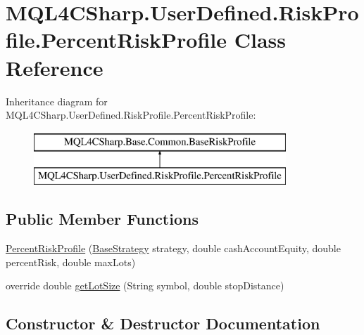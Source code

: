 \hypertarget{class_m_q_l4_c_sharp_1_1_user_defined_1_1_risk_profile_1_1_percent_risk_profile}{}\section{M\+Q\+L4\+C\+Sharp.\+User\+Defined.\+Risk\+Profile.\+Percent\+Risk\+Profile Class Reference}
\label{class_m_q_l4_c_sharp_1_1_user_defined_1_1_risk_profile_1_1_percent_risk_profile}
Inheritance diagram for M\+Q\+L4\+C\+Sharp.\+User\+Defined.\+Risk\+Profile.\+Percent\+Risk\+Profile\+:\begin{figure}[H]
\begin{center}
\leavevmode
\includegraphics[height=2.000000cm]{class_m_q_l4_c_sharp_1_1_user_defined_1_1_risk_profile_1_1_percent_risk_profile}
\end{center}
\end{figure}
\subsection*{Public Member Functions}
\begin{DoxyCompactItemize}
\item 
\hyperlink{class_m_q_l4_c_sharp_1_1_user_defined_1_1_risk_profile_1_1_percent_risk_profile_ae20f09e9a71337b11d91a123c6d82ee2}{Percent\+Risk\+Profile} (\hyperlink{class_m_q_l4_c_sharp_1_1_base_1_1_base_strategy}{Base\+Strategy} strategy, double cash\+Account\+Equity, double percent\+Risk, double max\+Lots)
\item 
override double \hyperlink{class_m_q_l4_c_sharp_1_1_user_defined_1_1_risk_profile_1_1_percent_risk_profile_aaa9b39306219c8aee5c62c01822805b8}{get\+Lot\+Size} (String symbol, double stop\+Distance)
\end{DoxyCompactItemize}


\subsection{Constructor \& Destructor Documentation}
